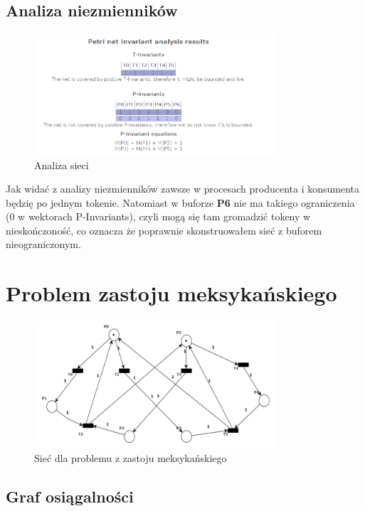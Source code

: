 \documentclass{article}
\begin{document}
\subsection{Analiza niezmienników}
\begin{figure}[H]
    \centering
    \includegraphics[width=0.8\textwidth, height=0.4\textheight]{zad5_analiza.png}
    \caption{Analiza sieci}
\end{figure}

Jak widać z analizy niezmienników zawsze w procesach producenta i konsumenta będzię po jednym tokenie.
Natomiast w buforze \textbf{P6} nie ma takiego ograniczenia (0 w wektorach P-Invariants), czyli mogą się tam gromadzić tokeny w
nieskończoność, co oznacza że poprawnie skonstruowałem sieć z buforem nieograniczonym.

\section{Problem zastoju meksykańskiego}
\begin{figure}[H]
    \centering
    \includegraphics[width=0.8\textwidth, height=0.4\textheight]{zad6.png}
    \caption{Sieć dla problemu z zastoju meksykańskiego}
\end{figure}

\subsection{Graf osiągalności}
\end{document}
